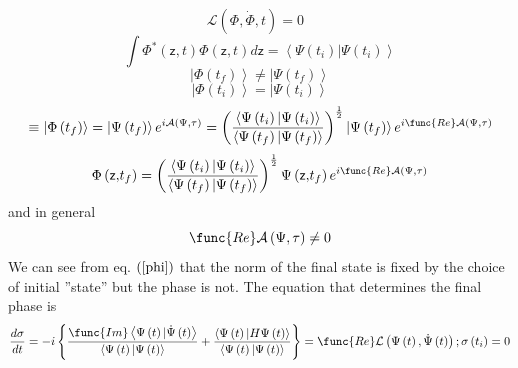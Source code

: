 \documentclass[aps,preprint]{revtex4}
\begin{document}
\begin{equation}
\mathcal{L}\left( \Phi ,\dot{\Phi},t\right) =0\text{ }
\end{equation}%
\begin{equation}
\int \Phi ^{\ast }\left( \mathsf{z,}t\right) \Phi \left( \mathsf{z,}t\right)
d\mathsf{z}=\left\langle \Psi \left( t_{i}\right) |\Psi \left( t_{i}\right)
\right\rangle
\end{equation}%
\begin{equation}
\left| \Phi \left( t_{f}\right) \right\rangle \neq \left| \Psi \left(
t_{f}\right) \right\rangle
\end{equation}%
\begin{equation}
\left| \Phi \left( t_{i}\right) \right\rangle =\left| \Psi \left(
t_{i}\right) \right\rangle
\end{equation}%
\begin{equation}
\left. \equiv \right. \left| \Phi \left( t_{f}\right) \right\rangle =\left|
\Psi \left( t_{f}\right) \right\rangle e^{i\mathcal{A}\left( \Psi ,\tau
\right) }=\left( \frac{\left\langle \Psi \left( t_{i}\right) |\Psi \left(
t_{i}\right) \right\rangle }{\left\langle \Psi \left( t_{f}\right) |\Psi
\left( t_{f}\right) \right\rangle }\right) ^{\frac{1}{2}}\left| \Psi \left(
t_{f}\right) \right\rangle e^{i\func{Re}\mathcal{A}\left( \Psi ,\tau \right)
}
\end{equation}%
\begin{equation}
\Phi \left( \mathsf{z,}t_{f}\right) =\left( \frac{\left\langle \Psi \left(
t_{i}\right) |\Psi \left( t_{i}\right) \right\rangle }{\left\langle \Psi
\left( t_{f}\right) |\Psi \left( t_{f}\right) \right\rangle }\right) ^{\frac{%
1}{2}}\Psi \left( \mathsf{z,}t_{f}\right) e^{i\func{Re}\mathcal{A}\left(
\Psi ,\tau \right) }  \label{phi}
\end{equation}%
and in general 
\begin{equation}
\func{Re}\mathcal{A}\left( \Psi ,\tau \right) \neq 0
\end{equation}%
We can see from eq. $\left( \ref{phi}\right) $ that the norm of the final
state is fixed by the choice of initial ''state'' but the phase is not. The
equation that determines the final phase is 
\begin{equation}
\frac{d\sigma }{dt}=-i\left\{ \frac{\func{Im}\left\langle \Psi \left(
t\right) |\dot{\Psi}\left( t\right) \right\rangle }{\left\langle \Psi \left(
t\right) |\Psi \left( t\right) \right\rangle }+\frac{\left\langle \Psi
\left( t\right) |H\Psi \left( t\right) \right\rangle }{\left\langle \Psi
\left( t\right) |\Psi \left( t\right) \right\rangle }\right\} =\func{Re}%
\mathcal{L}\left( \Psi \left( t\right) ,\dot{\Psi}\left( t\right) \right)
;\sigma \left( t_{i}\right) =0  \label{phase}
\end{equation}%
\end{document}

